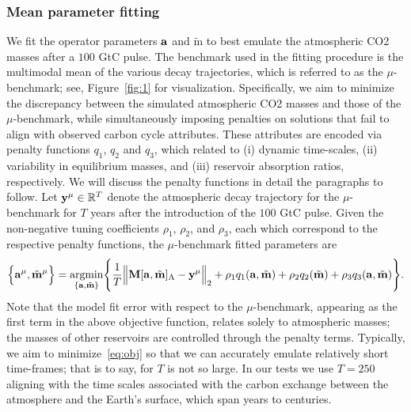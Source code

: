 \documentclass[11pt, a4paper, pdftex, twoside, dvipsnames]{article}
\renewcommand{\ref}{\cref}
\newcommand{\bb}[1]{\boldsymbol{\bold{#1}}}
\newcommand{\bbt}[1]{\tilde{\boldsymbol{\mathrm{#1}}}}
\newcommand{\argmin}[1]{\underset{#1}{\text{argmin}} }
\newcommand{\ameq}[0]{\bb{a},\bbt{m}}
\begin{document}
\subsubsection{Mean parameter fitting} \label{sec:2.2.1}
We fit the operator parameters $\bb{a}$ and $\bbt{m}$ to best emulate the atmospheric CO2 masses after a $100$ GtC pulse.
%
The benchmark used in the fitting procedure is the multimodal mean of the various decay trajectories, which is referred to as the $\mu$-benchmark; see, Figure~\ref{fig:1} for visualization.
%
Specifically, we aim to minimize the discrepancy between the simulated atmospheric CO2 masses and those of the $\mu$-benchmark, while simultaneously imposing penalties on solutions that fail to align with observed carbon cycle attributes.
%
These attributes are encoded via penalty functions $q_1$, $q_2$ and $q_3$, which related to (i) dynamic time-scales, (ii) variability in equilibrium masses, and (iii) reservoir absorption ratios, respectively.
%
We will discuss the penalty functions in detail the paragraphs to follow.
%
Let $\bb{y}^{\mu} \in \mathbb{R}^{T}$ denote the atmospheric decay trajectory for the $\mu$-benchmark for $T$ years after the introduction of the $100$ GtC pulse.
%
 Given the non-negative tuning coefficients $\rho_1$, $\rho_2$, and $\rho_3$, each which correspond to the respective penalty functions, the $\mu$-benchmark fitted parameters are
 \begin{align}\label{eq:obj}
 	\Big \{\bb{a}^{\mu},\bbt{m}^{\mu} \Big \} = \argmin{\{ \bb{a} , \bbt{m} \}}  
 	\Bigg\{  
 	     \frac{1}{T} \Big \| \bb{M}[\ameq]_\text{A} - \bb{y}^\mu \Big \|_2 +
 	 	 \rho_1 q_1(\ameq)   +  
 		 \rho_2 q_2(\bbt{m}) +   
 		 \rho_3 q_3(\ameq)  
 	\Bigg\}.
 \end{align}
%
Note that the model fit error with respect to the $\mu$-benchmark, appearing as the first term in the above objective function, relates solely to atmospheric masses; the masses of other reservoirs are controlled through the penalty terms.
%
Typically, we aim to minimize~\eqref{eq:obj} so that we can accurately emulate relatively short time-frames; that is to say, for $T$ is not so large. 
%
In our tests we use $T=250$ aligning with the time scales associated with the carbon exchange between the atmosphere and the Earth's surface, which span years to centuries.
%
%
\end{document}
